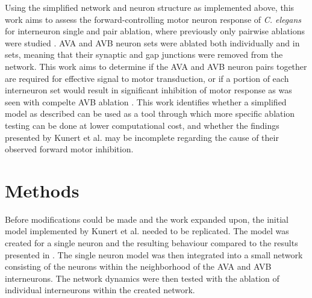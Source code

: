 \documentclass[11pt]{article} %
\begin{document}
Using the simplified network and neuron structure as implemented above, this work aims to assess the forward-controlling motor neuron response of \emph{C. elegans} for interneuron single and pair ablation, where previously only pairwise ablations were studied \cite{Kunert2014}. AVA and AVB neuron sets were ablated both individually and in sets, meaning that their synaptic and gap junctions were removed from the network. This work aims to determine if the AVA and AVB neuron pairs together are required for effective signal to motor transduction, or if a portion of each interneuron set would result in significant inhibition of motor response as was seen with compelte AVB ablation \cite{Kunert2014, Chalfie1985}. This work identifies whether a simplified model as described can be used as a tool through which more specific ablation testing can be done at lower computational cost, and whether the findings presented by Kunert et al. may be incomplete regarding the cause of their observed forward motor inhibition.

\section{Methods}

Before modifications could be made and the work expanded upon, the initial model implemented by Kunert et al. needed to be replicated. The model was created for a single neuron and the resulting behaviour compared to the results presented in \cite{Kunert2014}. The single neuron model was then integrated into a small network consisting of the neurons within the neighborhood of the AVA and AVB interneurons. The network dynamics were then tested with the ablation of individual interneurons within the created network.
\end{document}
